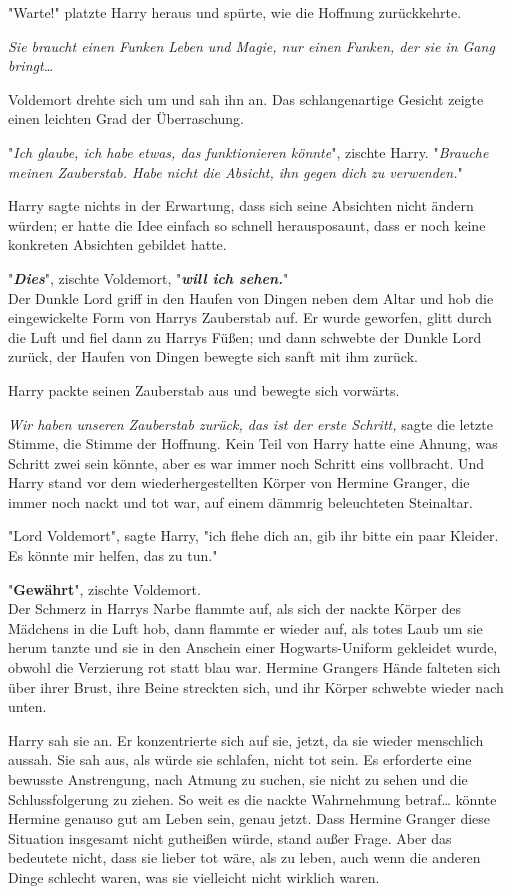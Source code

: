 {"Warte!" platzte Harry heraus und spürte, wie die Hoffnung zurückkehrte.

\emph{Sie braucht einen Funken Leben und Magie, nur einen Funken, der sie in Gang bringt…}

Voldemort drehte sich um und sah ihn an. Das schlangenartige Gesicht zeigte einen leichten Grad der Überraschung.

"\emph{Ich glaube, ich habe etwas, das funktionieren könnte}", zischte Harry. "\emph{Brauche meinen Zauberstab. Habe nicht die Absicht, ihn gegen dich zu verwenden.}"

Harry sagte nichts in der Erwartung, dass sich seine Absichten nicht ändern würden; er hatte die Idee einfach so schnell herausposaunt, dass er noch keine konkreten Absichten gebildet hatte.

"\textbf{\emph{Dies}}", zischte Voldemort, "\textbf{\emph{will ich sehen.}}"\\ Der Dunkle Lord griff in den Haufen von Dingen neben dem Altar und hob die eingewickelte Form von Harrys Zauberstab auf. Er wurde geworfen, glitt durch die Luft und fiel dann zu Harrys Füßen; und dann schwebte der Dunkle Lord zurück, der Haufen von Dingen bewegte sich sanft mit ihm zurück.

Harry packte seinen Zauberstab aus und bewegte sich vorwärts.

\emph{Wir haben unseren Zauberstab zurück, das ist der erste Schritt,} sagte die letzte Stimme, die Stimme der Hoffnung. Kein Teil von Harry hatte eine Ahnung, was Schritt zwei sein könnte, aber es war immer noch Schritt eins vollbracht. Und Harry stand vor dem wiederhergestellten Körper von Hermine Granger, die immer noch nackt und tot war, auf einem dämmrig beleuchteten Steinaltar.

"Lord Voldemort", sagte Harry, "ich flehe dich an, gib ihr bitte ein paar Kleider. Es könnte mir helfen, das zu tun."

"\textbf{Gewährt}", zischte Voldemort.\\ Der Schmerz in Harrys Narbe flammte auf, als sich der nackte Körper des Mädchens in die Luft hob, dann flammte er wieder auf, als totes Laub um sie herum tanzte und sie in den Anschein einer Hogwarts-Uniform gekleidet wurde, obwohl die Verzierung rot statt blau war. Hermine Grangers Hände falteten sich über ihrer Brust, ihre Beine streckten sich, und ihr Körper schwebte wieder nach unten.

Harry sah sie an. Er konzentrierte sich auf sie, jetzt, da sie wieder menschlich aussah. Sie sah aus, als würde sie schlafen, nicht tot sein. Es erforderte eine bewusste Anstrengung, nach Atmung zu suchen, sie nicht zu sehen und die Schlussfolgerung zu ziehen. So weit es die nackte Wahrnehmung betraf… könnte Hermine genauso gut am Leben sein, genau jetzt. Dass Hermine Granger diese Situation insgesamt nicht gutheißen würde, stand außer Frage. Aber das bedeutete nicht, dass sie lieber tot wäre, als zu leben, auch wenn die anderen Dinge schlecht waren, was sie vielleicht nicht wirklich waren.

}
